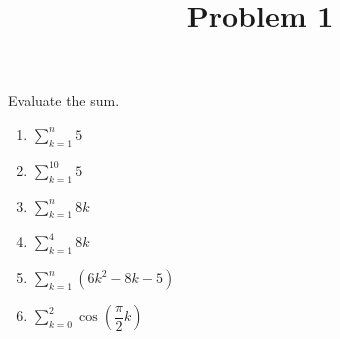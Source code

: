 \documentclass{ximera}
\title[Problem 1]{Problem 1}
\begin{document}
\begin{abstract} \end{abstract}
\maketitle

\begin{problem} Evaluate the sum.
\begin{enumerate}
	\item  $\displaystyle \sum_{k=1}^{n}5$
			
\item  $\displaystyle \sum_{k=1}^{10}5$
			
\item  $\displaystyle \sum_{k=1}^{n}8k$

	\item  $\displaystyle \sum_{k=1}^{4}8k$
			
\item  $\displaystyle \sum_{k=1}^{n}(6k^2-8k-5)$	
			
\item  $\displaystyle \sum_{k=0}^{2} \cos\left( \dfrac{\pi}{2}k\right)$
		
\end{enumerate}
\end{problem}
\end{document}
